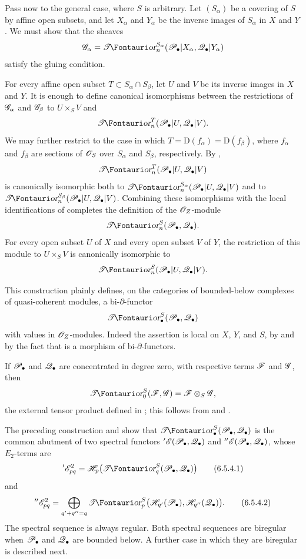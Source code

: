 \begin{env}[6.5.3]
\label{III.6.5.3}
Pass now to the general case, where $S$ is arbitrary.  Let
$(S_\alpha)$ be a covering of $S$ by affine open subsets, and let
$X_\alpha$ and $Y_\alpha$ be the inverse images of $S_\alpha$ in
$X$ and $Y$.  We must show that the sheaves
\[
  \sh G_\alpha
  =
  \shTor_n^{S_\alpha}
  (\sh P_\bullet|X_\alpha,\sh Q_\bullet|Y_\alpha)
\]
satisfy the gluing condition.

For every affine open subset
$T\subset S_\alpha\cap S_\beta$, let $U$ and $V$ be its inverse
images in $X$ and $Y$.  It is enough to define canonical
isomorphisms between the restrictions of $\mathscr{G}_\alpha$ and
$\mathscr{G}_\beta$ to $U\times_SV$ and
\[
  \shTor_n^T(\sh P_\bullet|U,\sh Q_\bullet|V).
\]
We may further restrict to the case in which
$T=\mathrm D(f_\alpha)=\mathrm D(f_\beta)$, where $f_\alpha$ and
$f_\beta$ are sections of $\mathscr{O}_S$ over $S_\alpha$ and
$S_\beta$, respectively.  By ,
\[
  \shTor_n^T(\sh P_\bullet|U,\sh Q_\bullet|V)
\]
is canonically isomorphic both to
$\shTor_n^{S_\alpha}(\sh P_\bullet|U,\sh Q_\bullet|V)$ and to
$\shTor_n^{S_\beta}(\sh P_\bullet|U,\sh Q_\bullet|V)$.
Combining these isomorphisms with the local identifications of
 completes the definition of the
$\mathscr{O}_Z$-module
\[
  \shTor_n^S(\sh P_\bullet,\sh Q_\bullet).
\]
For every open subset $U$ of $X$ and every open subset $V$ of
$Y$, the restriction of this module to $U\times_SV$ is
canonically isomorphic to
\[
  \shTor_n^S(\sh P_\bullet|U,\sh Q_\bullet|V).
\]

This construction plainly defines, on the categories of
bounded-below complexes of quasi-coherent modules, a
bi-$\partial$-functor
\[
  \shTor_\bullet^S(\sh P_\bullet,\sh Q_\bullet)
\]
with values in $\mathscr{O}_Z$-modules.  Indeed the assertion is local
on $X$, $Y$, and $S$, by  and by the fact that
 is a morphism of bi-$\partial$-functors.

If $\mathscr{P}_\bullet$ and $\mathscr{Q}_\bullet$ are concentrated in degree
zero, with respective terms $\mathscr{F}$ and $\mathscr{G}$, then
\[
  \shTor_0^S(\sh F,\sh G)
  =
  \sh F\otimes_S\sh G,
\]
the external tensor product defined in ; this
follows from  and .
\end{env}

\begin{env}[6.5.4]
\label{III.6.5.4}
The preceding construction and  show that
$\shTor_\bullet^S(\sh P_\bullet,\sh Q_\bullet)$ is the common abutment
of two spectral functors
$'\mathscr{E}(\mathscr{P}_\bullet,\mathscr{Q}_\bullet)$ and
$''\mathscr{E}(\mathscr{P}_\bullet,\mathscr{Q}_\bullet)$, whose $E_2$-terms are
\[
  '\sh E_{pq}^2
  =
  \sh H_p\bigl(\shTor_q^S(\sh P_\bullet,\sh Q_\bullet)\bigr)
  \tag{6.5.4.1}\label{III.6.5.4.1}
\]
and
\[
  ''\sh E_{pq}^2
  =
  \bigoplus_{q'+q''=q}
  \shTor_p^S
  \bigl(\sh H_{q'}(\sh P_\bullet),
        \sh H_{q''}(\sh Q_\bullet)\bigr).
  \tag{6.5.4.2}\label{III.6.5.4.2}
\]
The spectral sequence  is always regular.  Both
spectral sequences are biregular when $\mathscr{P}_\bullet$ and
$\mathscr{Q}_\bullet$ are bounded below.  A further case in which they
are biregular is described next.
\end{env}


